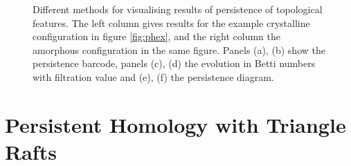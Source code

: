 \begin{figure}[tbp]
	\caption{Different methods for visualising results of persistence of topological features. The left column gives results for the example crystalline configuration in figure \ref{fig:phex}, and the right column the amorphous configuration in the same figure. Panels (a), (b) show the persistence barcode, panels (c), (d) the evolution in Betti numbers with filtration value and (e), (f) the persistence diagram.}
	\label{fig:exvis}
\end{figure}

\section{Persistent Homology with Triangle Rafts}

\begin{figure}[tb]
	\centering
     

\end{figure}
